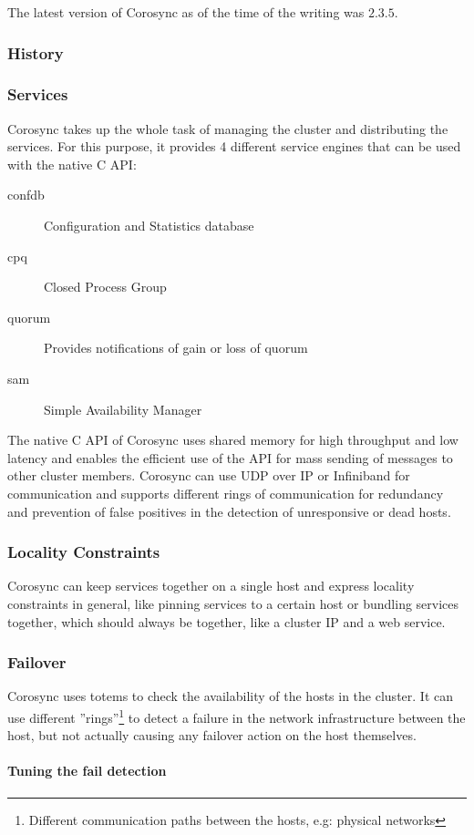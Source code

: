 The latest version of Corosync as of the time of the writing was $2.3.5$.
\subsubsection{History}
\subsubsection{Services}
Corosync takes up the whole task of managing the cluster and distributing the services. For this purpose, it provides 4 different service engines that can be used with the native C \ac{API}:
\begin{description}
\item [confdb] Configuration and Statistics database
\item [cpq] Closed Process Group
\item [quorum] Provides notifications of gain or loss of quorum
\item [sam] Simple Availability Manager
\end{description}
The native C API of Corosync uses shared memory for high throughput and low 
latency and enables the efficient use of the API for mass sending of messages to 
other cluster members.
\linebreak[3]
Corosync can use \ac{UDP} over IP or Infiniband for communication and supports different 
rings of communication for redundancy and prevention of false positives in the 
detection of unresponsive or dead hosts.
\subsubsection{Locality Constraints}
Corosync can keep services together on a single host and express locality constraints in general,
like pinning services to a certain host or bundling services together, which should
always be together, like a cluster IP and a web service.
\subsubsection{Failover}
Corosync uses totems\cite{Amir95thetotem} to check the availability of the hosts
in the cluster. It can use different ''rings''\footnote{Different communication
paths between the hosts, e.g: physical networks} to detect a failure
in the network infrastructure between the host, but not actually causing any failover
action on the host themselves.
\paragraph{Tuning the fail detection}

